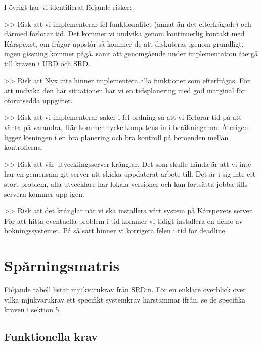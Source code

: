 \documentclass[a4paper, twoside, 11pt, titlepage]{article}
\begin{document}
	I övrigt har vi identifierat följande risker:

	>> Risk att vi implementerar fel funktionalitet (annat än det efterfrågade) och därmed förlorar tid. Det kommer vi undvika genom kontinuerlig kontakt med Kårspexet, om frågor uppstår så kommer de att diskuteras igenom grundligt, ingen gissning kommer pågå, samt att genomgående under implementation återgå till kraven i URD och SRD.

	>> Risk att Nyx inte hinner implementera alla funktioner som efterfrågas. För att undvika den här situationen har vi en tidsplanering med god marginal för oförutsedda uppgifter.

	>> Risk att vi implementerar saker i fel ordning så att vi förlorar tid på att vänta på varandra. Här kommer nyckelkompetens in i beräkningarna. Återigen ligger lösningen i en bra planering och bra kontroll på beroenden mellan kontrollerna.

	>> Risk att vår utvecklingsserver krånglar. Det som skulle hända är att vi inte har en gemensam git-server att skicka uppdaterat arbete till. Det är i sig inte ett stort problem, alla utvecklare har lokala versioner och kan fortsätta jobba tills servern kommer upp igen.

	>> Risk att det krånglar när vi ska installera vårt system på Kårspexets server. För att hitta eventuella problem i tid kommer vi tidigt installera en demo av bokningssystemet. På så sätt hinner vi korrigera felen i tid för deadline.

\clearpage
\section{Spårningsmatris}


Följande tabell listar mjukvarukrav från SRD:n. För en enklare överblick över vilka mjukvarukrav ett specifikt systemkrav härstammar ifrån, se de specifika kraven i sektion 5.

	\subsection{Funktionella krav}
\end{document}

